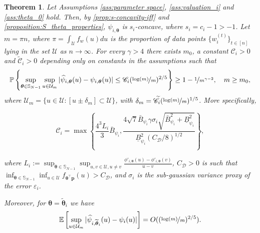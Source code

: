 \documentclass{article} %
\newtheorem{theorem}{Theorem}[section]
\begin{document}
\begin{theorem}\label{thm:Dumbgen}
Let Assumptions \ref{ass:parameter space}, \ref{ass:valuation_i} and \ref{ass:theta_0} hold. Then, by \cref{prop:s-concavity-iff} and \cref{proposition:S_theta_properties}, $\psi_{i,\boldsymbol{\theta}}$ is $s_i$-concave, where $s_i = c_i-1>-1$. Let $m = \pi n$, where $\pi = \int_{\mathcal{U}}f_{w}(u)du$ is the proportion of data points \(\{w_i^{(t)}\}_{t \in [n]}\) lying in the set $\mathcal{U}$ as $n\rightarrow \infty$. For every $\gamma>4$ there exists $m_0$, a constant $\mathscr{C}_i>0$ and $\widetilde{\mathscr{C}}_i>0$ depending only on constants in the assumptions such that
\begin{equation}\label{ineq:dumbgen_concentration}
\mathbb{P}\left\{\sup_{\boldsymbol{\theta} \in \mathbb{S}_{N-1}}\sup_{u \in \mathcal{U}_m} |\widehat \psi_{i,\boldsymbol{\theta}}(u)-\psi_{i,\boldsymbol{\theta}}(u)| \leq \mathscr{C}_i (\nicefrac{\log (m)}{m})^{2/5} \right\} \geq 1-\nicefrac{1}{m^{\gamma -2}}, \quad m \geq m_0,
\end{equation}
where $\mathcal{U}_m = \{u \in \mathcal{U}:\left[u \pm \delta_m\right] \subset \mathcal{U}\}$, with $\delta_m=\widetilde{\mathscr{C}}_i (\nicefrac{\log (m)}{m})^{1/5}$. More specifically, 

\begin{equation}\label{def:C_i}
\mathscr{C}_i = \max\left\{\frac{4^{3}L_i}{3}\bar{B}_{\psi_i}, \frac{4\sqrt{7}\bar{B}_{\psi_i}\gamma \sigma_i  \sqrt{\bar{B}_{\psi_i}^2+\underline{B}_{\psi_i}^2}}{\underline{B}_{\psi_i}^{2}  \left(C_{\mathscr{D}} / 8\right)^{1 / 2}}\right\},
\end{equation}

where $L_i:=\sup_{\boldsymbol{\theta}\in \mathbb{S}_{N-1}}\sup_{u,v \in \mathcal{U},u\neq v}\frac{\phi'_{i,\boldsymbol{\theta}}(u)-\phi'_{i,\boldsymbol{\theta}}(v)}{u-v}$, $C_{\mathscr{\mathscr{D}}}>0$ is such that $\inf_{\boldsymbol{\theta} \in \mathbb{S}_{N-1}} \inf_{u \in \mathcal{U}}f_{\boldsymbol{\theta}^{\top}\mathbf{p}} (u)>C_{\mathscr{\mathscr{D}}}$, and $\sigma_i$ is the sub-gaussian variance proxy of the error $\varepsilon_i$.

Moreover, for $\boldsymbol{\theta} = \widetilde{\boldsymbol{\theta}}_i$ we have 
\begin{equation}\label{eq:dumbgen_expectation}
\mathbb{E}\left[\sup_{u \in \mathcal{U}_m} |\widehat \psi_{i,\widetilde{\boldsymbol{\theta}}_i}(u)-\psi_{i}(u)|\right] = O((\nicefrac{\log (m)}{m})^{2/5}).
\end{equation}
\end{theorem}
\end{document}
